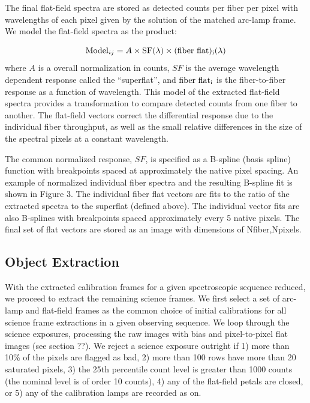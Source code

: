 \documentclass[12pt,preprint]{aastex}
\begin{document}
The final flat-field spectra are stored as 
detected counts per fiber per pixel with wavelengths of each pixel
given by the solution of the matched arc-lamp frame.  
We model the flat-field spectra as the product:


\begin{equation} 
{\rm Model}_{ij} = A \times {\rm SF}(\lambda) \times {\rm (fiber~flat)_i} (\lambda) 
\end{equation} 
where $A$ is a overall normalization in counts, 
$SF$ is the average wavelength dependent response called the ``superflat'', and
${\rm fiber~flat_i}$ is the fiber-to-fiber response as a function of wavelength.
This model of the extracted flat-field spectra provides a transformation to
compare detected counts from one fiber to another.
The flat-field vectors correct the differential response due to the individual fiber
throughput, as well as the small relative differences in the size of the
spectral pixels at a constant wavelength.  

The common normalized response, $SF$, is specified as a B-spline (basis spline)
function with breakpoints spaced at approximately the native pixel spacing.
An example of normalized individual fiber spectra 
and the resulting B-spline fit is shown in Figure 3.  The individual fiber
flat vectors are fits to the ratio of the extracted spectra to the superflat
(defined above).  The individual vector fits are also B-splines with breakpoints
spaced approximately every 5 native pixels.  The final set of flat vectors are
stored as an image with dimensions of Nfiber,Npixels.

\subsection{Object Extraction}

With the extracted calibration frames for a given spectroscopic sequence
reduced, we proceed to extract the remaining science frames.
We first select a set of arc-lamp and flat-field frames as the common
choice of initial calibrations for all science frame extractions in a given
observing sequence.  We loop through the science exposures, processing the
raw images with bias and pixel-to-pixel flat images (see section ??).
We reject a science exposure outright if 1) more than 10\% of the pixels
are flagged as bad, 2) more than 100 rows have more than 20 saturated
pixels, 3) the 25th
percentile count level is greater than 1000 counts (the nominal level
is of order 10 counts), 4) any of the flat-field petals are closed, or 5)
any of the calibration lamps are recorded as on.
\end{document}
